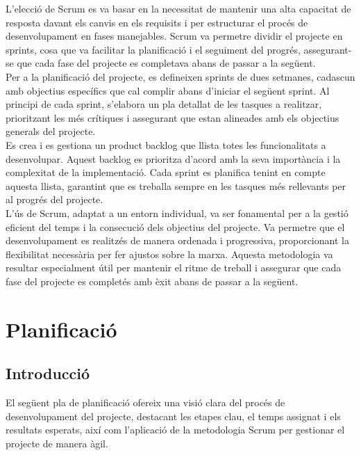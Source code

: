 \documentclass[a4paper,12pt,twoside]{ThesisStyle}
\begin{document}
L'elecció de Scrum es va basar en la necessitat de mantenir una alta capacitat de resposta davant els canvis en els requisits i per estructurar el procés de desenvolupament en fases manejables. Scrum va permetre dividir el projecte en sprints, cosa que va facilitar la planificació i el seguiment del progrés, assegurant-se que cada fase del projecte es completava abans de passar a la següent.\\

Per a la planificació del projecte, es defineixen sprints de dues setmanes, cadascun amb objectius específics que cal complir abans d’iniciar el següent sprint. Al principi de cada sprint, s’elabora un pla detallat de les tasques a realitzar, prioritzant les més crítiques i assegurant que estan alineades amb els objectius generals del projecte.\\

Es crea i es gestiona un product backlog que llista totes les funcionalitats a desenvolupar. Aquest backlog es prioritza d’acord amb la seva importància i la complexitat de la implementació. Cada sprint es planifica tenint en compte aquesta llista, garantint que es treballa sempre en les tasques més rellevants per al progrés del projecte.\\

L'ús de Scrum, adaptat a un entorn individual, va ser fonamental per a la gestió eficient del temps i la consecució dels objectius del projecte. Va permetre que el desenvolupament es realitzés de manera ordenada i progressiva, proporcionant la flexibilitat necessària per fer ajustos sobre la marxa. Aquesta metodologia va resultar especialment útil per mantenir el ritme de treball i assegurar que cada fase del projecte es completés amb èxit abans de passar a la següent.



\chapter{Planificació}
\label{chp:planificació}

\section{Introducció}
\label{sec:Introducció}

El següent pla de planificació ofereix una visió clara del procés de desenvolupament del projecte, destacant les etapes clau, el temps assignat i els resultats esperats, així com l'aplicació de la metodologia Scrum per gestionar el projecte de manera àgil.
\end{document}
